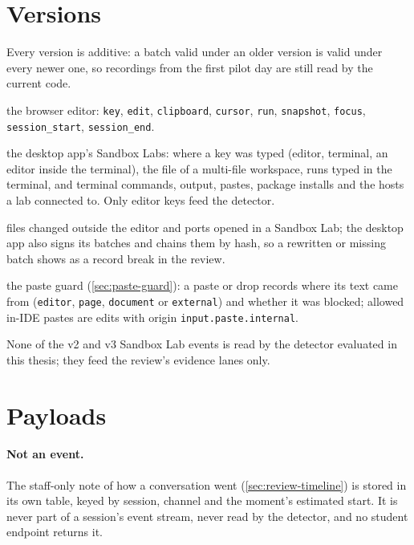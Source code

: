 \section{Versions}
Every version is additive: a batch valid under an older version is valid under
every newer one, so recordings from the first pilot day are still read by the
current code.
\begin{description}[nosep]
  \item[v1] the browser editor: \texttt{key}, \texttt{edit},
  \texttt{clipboard}, \texttt{cursor}, \texttt{run}, \texttt{snapshot},
  \texttt{focus}, \texttt{session\_start}, \texttt{session\_end}.
  \item[v2] the desktop app's Sandbox Labs: where a key was typed (editor,
  terminal, an editor inside the terminal), the file of a multi-file workspace,
  runs typed in the terminal, and terminal commands, output, pastes, package
  installs and the hosts a lab connected to. Only editor keys feed the
  detector.
  \item[v3] files changed outside the editor and ports opened in a Sandbox Lab;
  the desktop app also signs its batches and chains them by hash, so a
  rewritten or missing batch shows as a record break in the review.
  \item[v4] the paste guard (\cref{sec:paste-guard}): a paste or drop records
  where its text came from (\texttt{editor}, \texttt{page}, \texttt{document} or
  \texttt{external}) and whether it was blocked; allowed in-IDE pastes are edits
  with origin \texttt{input.paste.internal}.
\end{description}
None of the v2 and v3 Sandbox Lab events is read by the detector evaluated in
this thesis; they feed the review's evidence lanes only.

\section{Payloads}


\paragraph{Not an event.} The staff-only note of how a conversation went
(\cref{sec:review-timeline}) is stored in its own table, keyed by session,
channel and the moment's estimated start. It is never part of a session's event
stream, never read by the detector, and no student endpoint returns it.
